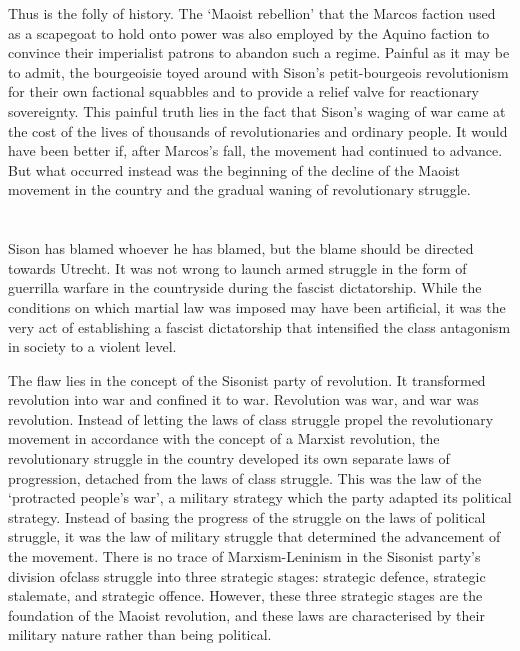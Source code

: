 Thus is the folly of history.
The `Maoist rebellion' that the Marcos faction used 
as a scapegoat to hold onto power 
was also employed by the Aquino faction 
to convince their imperialist patrons 
to abandon such a regime. 
Painful as it may be to admit, 
the bourgeoisie toyed around with Sison's petit-bourgeois revolutionism 
for their own factional squabbles 
and to provide a relief valve for reactionary sovereignty. 
This painful truth lies in the fact 
that Sison's waging of war 
came at the cost of the lives 
of thousands of revolutionaries and ordinary people. 
It would have been better if, after Marcos's fall, 
the movement had continued to advance. 
But what occurred instead was 
the beginning of the decline 
of the Maoist movement in the country 
and the gradual waning of revolutionary struggle.


\section{}
Sison has blamed whoever he has blamed,
but the blame should be directed towards Utrecht.
It was not wrong to launch armed struggle 
in the form of guerrilla warfare in the countryside 
during the fascist dictatorship. 
While the conditions on which martial law was imposed may have been artificial, 
it was the very act of establishing a fascist dictatorship 
that intensified the class antagonism in society to a violent level.

The flaw lies in the concept of the Sisonist party of revolution. 
It transformed revolution into war 
and confined it to war. 
Revolution was war, 
and war was revolution. 
Instead of letting the laws of class struggle 
propel the revolutionary movement 
in accordance with the concept of a Marxist revolution, 
the revolutionary struggle in the country 
developed its own separate laws of progression, 
detached from the laws of class struggle. 
This was the law of the `protracted people's war', 
a military strategy which the party adapted its political strategy. 
Instead of basing the progress of the struggle
on the laws of political struggle, 
it was the law of military struggle 
that determined the advancement of the movement. 
There is no trace of Marxism-Leninism 
in the Sisonist party's division ofclass struggle into three strategic stages: 
strategic defence, strategic stalemate, and strategic offence. 
However, 
these three strategic stages 
are the foundation of the Maoist revolution, 
and these laws are characterised 
by their military nature rather than being political.

